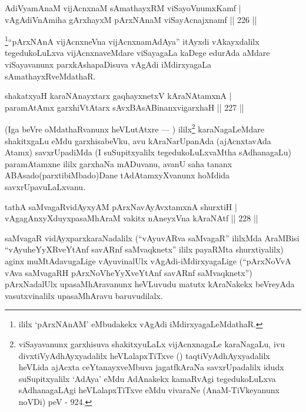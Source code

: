 \begin{shl}
AdiVyamAnaM vijAcnxnaM sAmathayxRM viSayoVnumxKamf |\\
vAgAdiVnAmiha gArxhayxM pArxNAnaM viSayAcnajxnamf \hfill || 226 ||
\end{shl}

\begin{artha}
\footnote{ililx `pArxNAnAM' eMbudakekx vAgAdi  iMdirxyagaLeMdathaR.}``pArxNAnA vijAcnxneVna vijAcnxnamAdAya'' itAyxdi vAkayxdalilx tegedukoLuLxva vijAcnxnaveMdare viSayagaLa kaDege edurAda aMdare viSayavanunx parxkAshapaDisuva vAgAdi iMdirxyagaLa sAmathayxRveMdathaR.
\end{artha}

\begin{shl}
shakatxyaH karaNAnayxtarx gaqhayxnetxV kAraNAtamxnA |\\
paramAtAmx garxhiVtA\s tarx sAvxBAsABinanxvigarxhaH \hfill || 227 ||
\end{shl}

\begin{artha}
(Iga beVre oMdathaRvanunx heVLutAtxre {\rm ---} ) ililx\footnote{viSayavanunx garxhisuva shakitxyuLaLx vijAcnxnagaLe karaNagaLu, ivu divxtiVyAdhAyxyadalilx heVLalapxTiTxve (\quad) taqtiVyAdhAyxyadalilx heVLida ajAcxta ceYtanayxveMbuva jagatfkAraNa savxrUpadalilx idudx suSupitxyalilx `AdAya' eMdu AdAnakekx kamaRvAgi tegedukoLuLxva sAdhanagaLAgi heVLalapxTiTxve eMdu vivaraNe (AnaM-TiVkeyanunx noVDi) peV - 924.} karaNagaLeMdare shakitxgaLu eMdu garxhisabeVku, avu kAraNarUpanAda (ajAcnxtavAda Atamx) savxrUpadiMda (I suSupitxyalilx tegedukoLuLxvaMtha sAdhanagaLu) paramAtamxne ililx garxhaNa mADuvanu, avanU saha tananx ABAsado(parxtibiMbado)Dane tAdAtamxyXvanunx hoMdida savxrUpavuLaLxvanu.
\end{artha}


\begin{shl}
tathA saMvagaRvidAyxyAM pArxNavAyAvxtamxnA shurxtiH |\\
vAgagAnxyXduyxpasaMhAraM vakitx nAneyxVna kAraNAtf \hfill || 228 ||
\end{shl}

\begin{artha}
saMvagaR vidAyxparxkaraNadalilx (``vAyuvARva saMvagaR'' ililxMda AraMBisi ``vAyuheYyXRveYtAnf savARnf saMvaqknetx'' ililx payaRMta shurxtiyalilx) aginx \-muMtAdavugaLige vAyuvinalUlx vAgAdi-iMdirxyagaLige (``pArxNoVvA vAva saMvagaRH pArxNoVheYyXveYtAnf savARnf saMvaqknetx'') pArxNadalUlx upasaMhAra\-vanunx heVLuvudu matutx kAraNakekx beVreyAda vasutxvinalilx upasaMhAravu baruvudilalx.
\end{artha}


